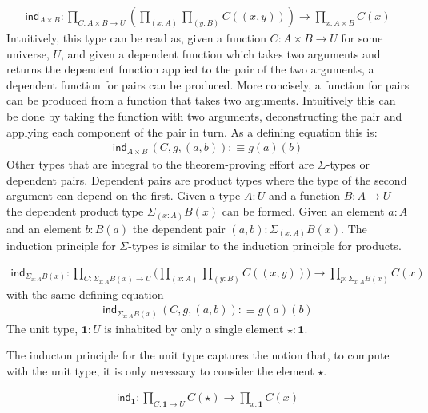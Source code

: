 \begin{align*}
    \textsf{ind}_{A \times B} : \prod_{C : A \times B\rightarrow
    U}(\prod_{(x : A)}\prod_{(y : B)}C((x , y))) \rightarrow \prod_{x : A\times
    B}C(x)
\end{align*}
Intuitively, this type can be read as, given a function $C : A \times B
\rightarrow U$ for some universe, $U$, and given a dependent function which
takes two arguments and returns the dependent function applied to the pair of the two
arguments, a dependent function for pairs can be produced. More concisely, a
function for pairs can be produced from a function that takes two arguments.
Intuitively this can be done by taking the function with two arguments,
deconstructing the pair and applying each component of the pair in turn. As a
defining equation this is:
\begin{align*}
    \textsf{ind}_{A \times B}\, (C, g, (a , b)) :\equiv g(a)(b)
\end{align*}
Other types that are integral to the theorem-proving effort are $\Sigma$-types
or dependent pairs. Dependent pairs are product types where the
type of the second argument can depend on the first. Given a type $A : U$ and a
function $B : A \rightarrow U$ the dependent product type $\Sigma_{(x :
A)}B(x)$ can be formed. Given an element $a : A$ and an element $b : B(a)$ the
dependent pair $(a,b) : \Sigma_{(x : A)}B(x)$. The induction principle for
$\Sigma$-types is similar to the induction principle for products.

\begin{align*}
    \textsf{ind}_{\Sigma_{x :A}B(x)} : \prod_{C : \Sigma_{x : A }B(x)\rightarrow
    U}\bigg(\prod_{(x : A)}\prod_{(y : B)}C((x , y))\bigg) \rightarrow \prod_{p :
    \Sigma_{x : A}B(x)}C(x)
\end{align*}
with the same defining equation
\begin{align*}
    \textsf{ind}_{\Sigma_{x :A}B(x)}\, (C, g, (a , b)) :\equiv g(a)(b)
\end{align*}
The unit type, $\textbf{1} : U$ is inhabited by only a single element $\star :
\textbf{1}$.

The inducton principle for the unit type captures the notion that, to compute
with the unit type, it is only necessary to consider the element $\star$.

\begin{align*}
    \textsf{ind}_{\textbf{1}} : \prod_{C : \textbf{1} \rightarrow U}C(\star)
    \rightarrow \prod_{x : \textbf{1}}C(x)
\end{align*}

